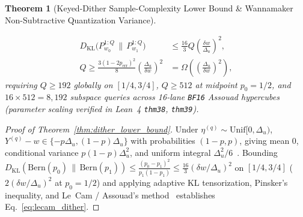 \documentclass[11pt,letterpaper]{article}
\theoremstyle{spectralthm}
\newtheorem{theorem}{Theorem}[section]
\begin{document}
\begin{theorem}[Keyed-Dither Sample-Complexity Lower Bound \& Wannamaker Non-Subtractive Quantization Variance]
\begin{enumerate}
  \begin{equation}
  \label{eq:lecam_dither}
  \begin{aligned}
  D_{\mathrm{KL}}\bigl(P_{w_0}^{1:Q} \,\|\, P_{w_1}^{1:Q}\bigr) &\le \frac{16}{3} Q \left(\frac{\delta w}{\Delta_u}\right)^{\!2},\\
  Q \ge \frac{3(1 - 2p_{\mathrm{err}})^2}{8}\left(\frac{\Delta_u}{\delta w}\right)^{\!2} &= \Omega\!\left(\left(\frac{\Delta_u}{\delta w}\right)^{\!2}\right),
  \end{aligned}
  \end{equation}
  requiring $Q \ge 192$ globally on $[1/4,3/4]$, $Q \ge 512$ at midpoint $p_0 = 1/2$, and $16 \times 512 = 8,192$ subspace queries across 16-lane \texttt{BF16} Assouad hypercubes~\cite{assouad1983deux} (parameter scaling verified in Lean~4 \texttt{thm38}, \texttt{thm39}).
\end{enumerate}
\end{theorem}
\begin{proof}[Proof of Theorem~\ref{thm:dither_lower_bound}]
Under $\eta^{(q)} \sim \mathrm{Unif}[0,\Delta_u)$, $Y^{(q)} - w \in \{-p\Delta_u, (1-p)\Delta_u\}$ with probabilities $(1-p, p)$, giving mean $0$, conditional variance $p(1-p)\Delta_u^2$, and uniform integral $\Delta_u^2/6$~\cite{wannamaker2000nonsubtractive}. Bounding $D_{\mathrm{KL}}(\mathrm{Bern}(p_0)\,\|\,\mathrm{Bern}(p_1)) \le \frac{(p_0-p_1)^2}{p_1(1-p_1)} \le \frac{16}{3}(\delta w/\Delta_u)^2$ on $[1/4,3/4]$ ($2(\delta w/\Delta_u)^2$ at $p_0=1/2$) and applying adaptive KL tensorization, Pinsker's inequality, and Le~Cam / Assouad's method~\cite{assouad1983deux} establishes Eq.~\eqref{eq:lecam_dither}.
\end{proof}
\end{document}
